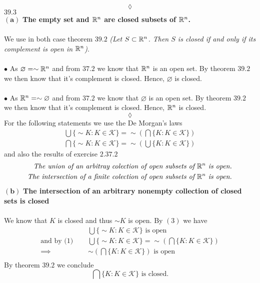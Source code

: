 $$\lozenge$$
$\mathbf{39.3}$\\ 
$\mathbf{(a)}$ \textbf{The empty set and $\mathbb{R}^n$ are closed subsets of $\mathbb{R}^n$.\\\\}
We use in both case theorem $\mathbf{39.2}$ \textit{(Let $S \subset \mathbb{R}^n$. Then $S$ is closed if and only if its complement
is open in $\mathbb{R}^n$)}.\\\\
$\bullet$ As $\varnothing=\sim \mathbb{R}^n$ and from $\mathbf{37.2}$ we know that  $\mathbb{R}^n$ is an open set. By theorem $\mathbf{39.2}$ we then know that it's complement is closed. Hence, $\varnothing$ is closed. \\\\
$\bullet$ As $\mathbb{R}^n =\sim \varnothing $ and from $\mathbf{37.2}$ we know that  $\varnothing$ is an open set. By theorem $\mathbf{39.2}$ we then know that it's complement is closed. Hence, $\mathbb{R}^n$ is closed. 
$$\lozenge$$
For the following statements we use the De Morgan's laws
\begin{align}
\bigcup\{\sim K:K\in\mathscr{K}\} = \sim \left(\bigcap\{ K:K\in\mathscr{K}\}\right)\\
\bigcap\{\sim K:K\in\mathscr{K}\} = \sim \left(\bigcup\{ K:K\in\mathscr{K}\}\right)
\end{align}
 and also the results of exercise $\mathbf{2.37.2}$
 \begin{align}
 \textit{The union of an arbitray colection of open subsets of }\mathbb{R}^n\textit{ is open.}\\
 \textit{The intersection  of a finite colection of open subsets of }\mathbb{R}^n\textit{ is open.}
 \end{align}
$\mathbf{(b)}$ \textbf{The intersection of an arbitrary nonempty collection of closed sets is closed}\\\\
We know that $K$ is closed and thus $\sim K$ is open. By $(3)$ we have
\begin{align*}
& \bigcup\{\sim K:K\in\mathscr{K}\} \text{ is open}\\
\text{and by (1) }\quad  & \bigcup\{\sim K:K\in\mathscr{K}\} = \sim \left(\bigcap\{ K:K\in\mathscr{K}\}\right)\\
\implies\quad &   \sim\left(\bigcap\{ K:K\in\mathscr{K}\}\right) \text{ is open}\\
\end{align*}
By theorem $\mathbf{39.2}$ we conclude 
$$\bigcap\{ K:K\in\mathscr{K}\} \text{ is closed.}$$\\\\
